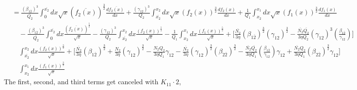 \documentclass[fleqn, 10pt]{article}
\begin{document}
            \begin{equation*}
            \begin{split}
            &= \frac{(\beta_{1\overline{2}})^3}{\overline{Q_2}} \int^{\overline{x_2}}_0 dx \sqrt{x} (\overline{f_2(x)})^\frac{3}{2} \frac{d\overline{f_2(x)}}{dx} + \frac{(\gamma_{12})^3}{Q_2} \int^{x_2}_{\overline{x_2}} dx \sqrt{x} (f_2(x))^\frac{3}{2} \frac{df_2(x)}{dx} + \frac{1}{Q_1} \int^{x_1}_{x_2} dx \sqrt{x} (f_1(x))^\frac{3}{2} \frac{df_1(x)}{dx} \\ & \quad - \frac{(\beta_{1\overline{2}})^3}{\overline{Q_2}} \int^{\overline{x_2}}_0 dx \frac{(\overline{f_2(x)})^\frac{5}{2}}{\sqrt{x}} - \frac{(\gamma_{12})^3}{Q_2} \int^{x_2}_{\overline{x_2}} dx \frac{(f_2(x))^\frac{5}{2}}{\sqrt{x}} - \frac{1}{Q_1} \int^{x_1}_{x_2} dx \frac{(f_1(x))^\frac{5}{2}}{\sqrt{x}} + \Biggl[ \frac{\overline{N_2}}{3 \eta} (\beta_{1\overline{2}})^\frac{3}{2} (\gamma_{12})^\frac{3}{2} - \frac{\overline{N_2} \overline{Q_2}}{3 \eta Q_2} (\gamma_{12})^3 \left(\frac{\beta_{1\overline{2}}}{\gamma_{12}}\right) \Biggr] \\ & \quad \int^{x_2}_{\overline{x_2}} dx \frac{(f_2(x))^\frac{3}{2}}{\sqrt{x}} + \Biggl[ \frac{\overline{N_2}}{3 \eta} (\beta_{1\overline{2}})^\frac{3}{2} + \frac{N_2}{3 \eta} (\gamma_{12})^\frac{3}{2} - \frac{N_2 Q_2}{3 \eta Q_1} \gamma_{12} - \frac{\overline{N_2}}{3 \eta} (\gamma_{12})^\frac{3}{2} (\beta_{2\overline{2}})^\frac{3}{2} - \frac{\overline{N_2} \overline{Q_2}}{3 \eta Q_1} \left(\frac{\beta_{1\overline{2}}}{\gamma_{12}}\right) \gamma_{12} + \frac{\overline{N_2} Q_2}{3 \eta Q_1} (\beta_{2\overline{2}})^\frac{3}{2} \gamma_{12} \Biggr] \\ & \quad \int^{x_1}_{x_2} dx \frac{(f_1(x))^\frac{3}{2}}{\sqrt{x}} 
            \end{split}
            \end{equation*}
            The first, second, and third terms get canceled with $K_{11} \cdot 2$,
\end{document}
